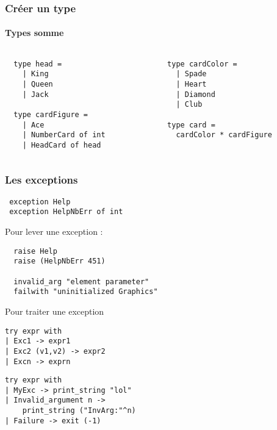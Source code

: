 \begin{frame}[fragile]
	\frametitle{Créer un type}
	\framesubtitle{Types somme}
	\begin{columns}
		\begin{column}{5cm}
			\begin{lstlisting}
  type head =
    | King
    | Queen
    | Jack

  type cardFigure =
    | Ace
    | NumberCard of int
    | HeadCard of head
			\end{lstlisting}
		\end{column}
		\begin{column}{7cm}
			\begin{lstlisting}
  type cardColor =
    | Spade
    | Heart
    | Diamond
    | Club

  type card =
    cardColor * cardFigure
			\end{lstlisting}
		\end{column}
	\end{columns}
\end{frame}

\begin{frame}[fragile]
	\frametitle{Les exceptions}
	\begin{lstlisting}
 exception Help
 exception HelpNbErr of int
	\end{lstlisting}
	\begin{block}{Pour lever une exception :}
		\begin{lstlisting}
  raise Help
  raise (HelpNbErr 451)

  invalid_arg "element parameter"
  failwith "uninitialized Graphics"
		\end{lstlisting}
	\end{block}
	\begin{block}{Pour traiter une exception}
		\begin{center}
			\begin{minipage}{4.2cm}
				\lstset{basicstyle=\scriptsize}
				\begin{lstlisting}
try expr with
| Exc1 -> expr1
| Exc2 (v1,v2) -> expr2
| Excn -> exprn
				\end{lstlisting}
			\end{minipage}
			\begin{minipage}{5cm}
				\lstset{basicstyle=\scriptsize}
				\begin{lstlisting}
try expr with
| MyExc -> print_string "lol"
| Invalid_argument n ->
    print_string ("InvArg:"^n)
| Failure -> exit (-1)
				\end{lstlisting}
			\end{minipage}
		\end{center}
	\end{block}
\end{frame}
